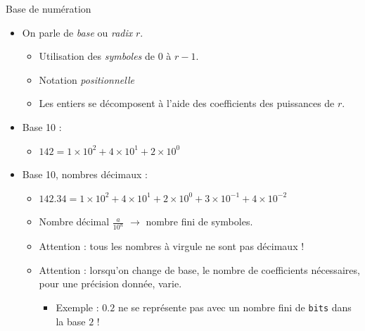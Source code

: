 \begin{frame}{Base de numération}
  \begin{itemize}
    \item On parle de \textit{base} ou \textit{radix} $r$.
    \begin{itemize}
      \item Utilisation des \textit{symboles} de $0$ à $r-1$.
      \item Notation \textit{positionnelle}
      \item Les entiers se décomposent à l'aide des coefficients des puissances de $r$.
    \end{itemize}

    \item Base 10 :
    \begin{itemize}
      \item $142 = 1\times 10^2 + 4 \times 10^1 + 2  \times 10^0$
    \end{itemize}

    \item Base 10, nombres décimaux :
    \begin{itemize}
      \item $142.34 = 1\times 10^2 + 4 \times 10^1 + 2  \times 10^0 + 3 \times 10^{-1} + 4 \times 10^{-2}$
      \item Nombre décimal $\frac{a}{10^n}$ $\rightarrow$ nombre fini de symboles.
      \item Attention : tous les nombres à virgule ne sont pas décimaux !
      \item Attention : lorsqu'on change de base, le nombre de coefficients nécessaires, pour une précision donnée, varie.
      \begin{itemize}
        \item Exemple : $0.2$ ne se représente pas avec un nombre fini de \texttt{bits} dans la base $2$ !
      \end{itemize}

    \end{itemize}
  \end{itemize}
\end{frame}

